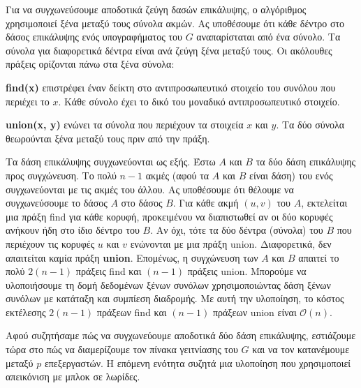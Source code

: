 \documentclass[12pt,a4paper]{article} %
\begin{document}
{{Για να συγχωνεύσουμε αποδοτικά ζεύγη δασών επικάλυψης, ο αλγόριθμος
χρησιμοποιεί ξένα μεταξύ τους σύνολα ακμών. Ας υποθέσουμε ότι κάθε
δέντρο στο δάσος επικάλυψης ενός υπογραφήματος του $G$ αναπαρίσταται από
ένα σύνολο. Τα σύνολα για διαφορετικά δέντρα είναι ανά ζεύγη ξένα
μεταξύ τους. Οι ακόλουθες πράξεις ορίζονται πάνω στα ξένα σύνολα:

\vspace{0.3cm}
\textbf{find(x)} επιστρέφει έναν δείκτη στο αντιπροσωπευτικό στοιχείο
του συνόλου που περιέχει το $x$. Κάθε σύνολο έχει το δικό του μοναδικό
αντιπροσωπευτικό στοιχείο.

\textbf{union(x, y)} ενώνει τα σύνολα που περιέχουν τα στοιχεία $x$ και
$y$. Τα δύο σύνολα θεωρούνται ξένα μεταξύ τους πριν από την πράξη.

\vspace{0.3cm}
Τα δάση επικάλυψης συγχωνεύονται ως εξής. Έστω $A$ και $B$ τα δύο
δάση επικάλυψης προς συγχώνευση. Το πολύ $n - 1$ ακμές (αφού τα $A$
και $B$ είναι δάση) του ενός συγχωνεύονται με τις ακμές του άλλου.
Ας υποθέσουμε ότι θέλουμε να συγχωνεύσουμε το δάσος $A$ στο δάσος $B$.
Για κάθε ακμή $(u, v)$ του $A$, εκτελείται μια πράξη find για
κάθε κορυφή, προκειμένου να διαπιστωθεί αν οι δύο κορυφές ανήκουν ήδη
στο ίδιο δέντρο του $B$. Αν όχι, τότε τα δύο δέντρα (σύνολα) του $B$
που περιέχουν τις κορυφές $u$ και $v$ ενώνονται με μια πράξη
union. Διαφορετικά, δεν απαιτείται καμία πράξη \textbf{union}.
Επομένως, η συγχώνευση των $A$ και $B$ απαιτεί το πολύ $2(n - 1)$
πράξεις find και $(n - 1)$ πράξεις union. Μπορούμε
να υλοποιήσουμε τη δομή δεδομένων ξένων συνόλων χρησιμοποιώντας δάση ξένων συνόλων με κατάταξη και
συμπίεση διαδρομής. Με αυτή την υλοποίηση, το κόστος εκτέλεσης
$2(n - 1)$ πράξεων find και $(n - 1)$ πράξεων union
είναι $\mathcal{O}(n)$.

Αφού συζητήσαμε πώς να συγχωνεύουμε αποδοτικά δύο δάση επικάλυψης,
εστιάζουμε τώρα στο πώς να διαμερίζουμε τον πίνακα γειτνίασης του
$G$ και να τον κατανέμουμε μεταξύ $p$ επεξεργαστών. Η επόμενη ενότητα
συζητά μια υλοποίηση που χρησιμοποιεί απεικόνιση με μπλοκ σε λωρίδες.


\begin{figure}[H]
\centering

\begin{minipage}[b]{0.4\textwidth}
\centering
{}
\end{minipage}
\end{figure}}}
\end{document}
